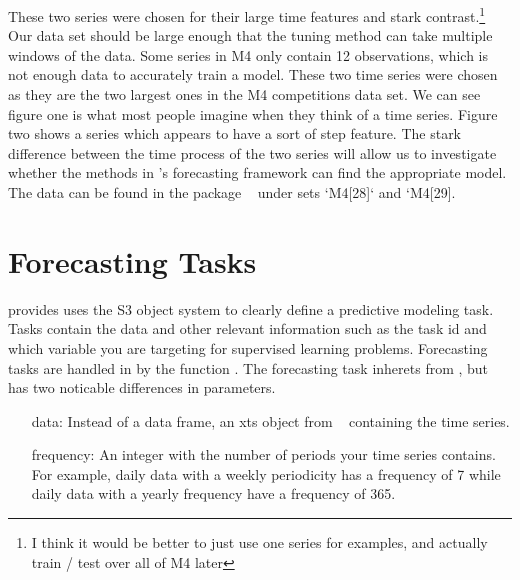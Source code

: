 \documentclass[article]{jss}\usepackage[]{graphicx}\usepackage[]{color}
\begin{document}
These two series were chosen for their large time features and stark contrast.\footnote{I think it would be better to just use one series for examples, and actually train / test over all of M4 later} Our data set should be large enough that the tuning method can take multiple windows of the data. Some series in M4 only contain 12 observations, which is not enough data to accurately train a model. These two time series were chosen as they are the two largest ones in the M4 competitions data set. We can see figure one is what most people imagine when they think of a time series. Figure two shows a series which appears to have a sort of step feature. The stark difference between the time process of the two series will allow us to investigate whether the methods in 's forecasting framework can find the appropriate model. The data can be found in the package  ~\cite{m4comp} under sets `M4[28]` and `M4[29]. 

\section{Forecasting Tasks}

 provides uses the S3 object system to clearly define a predictive modeling task. Tasks contain the data and other relevant information such as the task id and which variable you are targeting for supervised learning problems. Forecasting tasks are handled in  by the function . The forecasting task inherets from , but has two noticable differences in parameters.

\begin{itemize}
\item[data:] Instead of a data frame, an xts object from  ~\cite{xts} containing the time series.
\item[frequency:] An integer with the number of periods your time series contains. For example, daily data with a weekly periodicity has a frequency of 7 while daily data with a yearly frequency have a frequency of 365.
\end{itemize}
\end{document}
